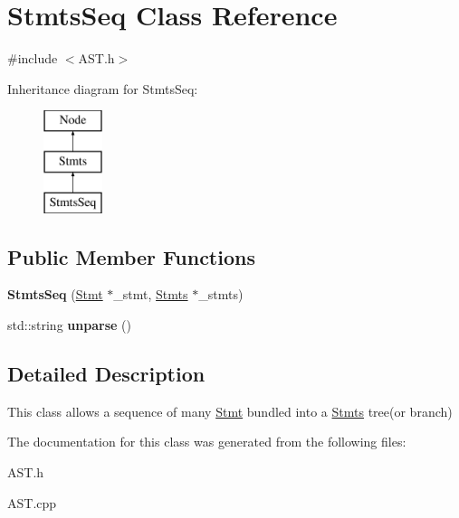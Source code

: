 \hypertarget{classStmtsSeq}{\section{Stmts\-Seq Class Reference}
\label{classStmtsSeq}
}


{\ttfamily \#include $<$A\-S\-T.\-h$>$}

Inheritance diagram for Stmts\-Seq\-:\begin{figure}[H]
\begin{center}
\leavevmode
\includegraphics[height=3.000000cm]{classStmtsSeq}
\end{center}
\end{figure}
\subsection*{Public Member Functions}
\begin{DoxyCompactItemize}
\item 
\hypertarget{classStmtsSeq_a4712f47aa19254d0c5fdece5c83a8b3a}{{\bfseries Stmts\-Seq} (\hyperlink{classStmt}{Stmt} $\ast$\-\_\-stmt, \hyperlink{classStmts}{Stmts} $\ast$\-\_\-stmts)}\label{classStmtsSeq_a4712f47aa19254d0c5fdece5c83a8b3a}

\item 
\hypertarget{classStmtsSeq_ad717a80bb854d28a9621e9921d01ba7f}{std\-::string {\bfseries unparse} ()}\label{classStmtsSeq_ad717a80bb854d28a9621e9921d01ba7f}

\end{DoxyCompactItemize}


\subsection{Detailed Description}
This class allows a sequence of many \hyperlink{classStmt}{Stmt} bundled into a \hyperlink{classStmts}{Stmts} tree(or branch) 

The documentation for this class was generated from the following files\-:\begin{DoxyCompactItemize}
\item 
A\-S\-T.\-h\item 
A\-S\-T.\-cpp\end{DoxyCompactItemize}
